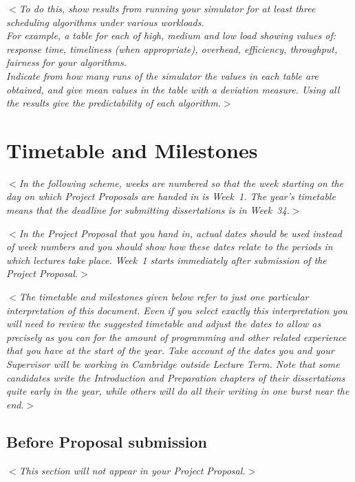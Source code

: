 \documentclass[12pt]{article}
\newcommand{\al}{$<$}
\newcommand{\ar}{$>$}
\begin{document}
\al\emph{To do this, show results from running your simulator for at
  least three scheduling algorithms under various workloads.\\
  For example, a table for each of high, medium and low load showing
  values of: response time, timeliness (when appropriate), overhead,
  efficiency, throughput, fairness for your algorithms.\\
  Indicate from how many runs of the simulator the values in each
  table are obtained, and give mean values in the table with a
  deviation measure.  Using all the results give the predictability of
  each algorithm.}\ar


\section*{Timetable and Milestones}

\al\emph{In the following scheme, weeks are numbered so that the week
  starting on the day on which Project Proposals are handed in is
  Week~1.  The year's timetable means that the deadline for submitting
  dissertations is in Week~34.}\ar

\al\emph{In the Project Proposal that you hand in, {\rm actual dates}
  should be used instead of week numbers and you should show how these
  dates relate to the periods in which lectures take place. Week~1
  starts immediately after submission of the Project Proposal.}\ar

\al\emph{The timetable and milestones given below refer to just one
  particular interpretation of this document.  Even if you select
  exactly this interpretation you will need to review the suggested
  timetable and adjust the dates to allow as precisely as you can for
  the amount of programming and other related experience that you have
  at the start of the year.  Take account of the dates you and your
  Supervisor will be working in Cambridge outside Lecture Term.  Note
  that some candidates write the Introduction and Preparation chapters
  of their dissertations quite early in the year, while others will do
  all their writing in one burst near the end}.\ar

\newpage %

\subsection*{Before Proposal submission}

\al\emph{This section will not appear in your Project Proposal.}\ar
 
\end{document}
